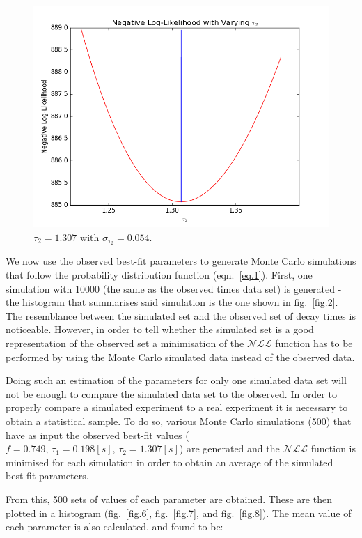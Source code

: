 \documentclass[a4paper,12pt]{article}
\begin{document}
\begin{figure}[h]
\begin{minipage}{.32\textwidth}
  \includegraphics[width=1.05\linewidth]{img/tau2_varyingNLL}
  \caption{$\tau_2=1.307$ with $\sigma_{\tau_2}=0.054$.}
  \label{fig.5}
\end{minipage}
\end{figure}

We now use the observed best-fit parameters to generate Monte Carlo simulations that follow the probability distribution function (eqn.~\ref{eq.1}). First, one simulation with 10000 (the same as the observed times data set) is generated - the histogram that summarises said simulation is the one shown in fig.~\ref{fig.2}. The resemblance between the simulated set and the observed set of decay times is noticeable. However, in order to tell whether the simulated set is a good representation of the observed set a minimisation of the $\mathcal{NLL}$ function has to be performed by using the Monte Carlo simulated data instead of the observed data. 

Doing such an estimation of the parameters for only one simulated data set will not be enough to compare the simulated data set to the observed. In order to properly compare a simulated experiment to a real experiment it is necessary to obtain a statistical sample. To do so, various Monte Carlo simulations (500) that have as input the observed best-fit values ($f = 0.749, \,\tau_1 = 0.198 [s], \,\tau_2 = 1.307 [s]$) are generated and the $\mathcal{NLL}$ function is minimised for each simulation in order to obtain an average of the simulated best-fit parameters.

From this, 500 sets of values of each parameter are obtained. These are then plotted in a histogram (fig.~\ref{fig.6}, fig.~\ref{fig.7}, and fig.~\ref{fig.8}). The mean value of each parameter is also calculated, and found to be:
\end{document}
